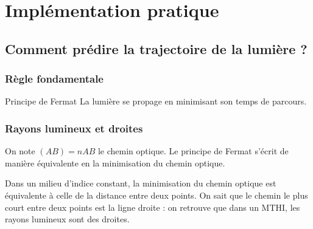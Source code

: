 \documentclass{beamercours}
\begin{document}
\section{Implémentation pratique}
\subsection{Comment prédire la trajectoire de la lumière ?}

\begin{frame}
\frametitle{Règle fondamentale}
\begin{théorème}{Principe de Fermat}{}
La lumière se propage en minimisant son temps de parcours.
\end{théorème}
\end{frame}

\begin{frame}
\frametitle{Rayons lumineux et droites}
On note $(AB) = nAB$ le chemin optique. Le principe de Fermat s'écrit de manière équivalente en la minimisation du chemin optique.\\
\begin{remarque}{}{}
	Dans un milieu d'indice constant, la minimisation du chemin optique est équivalente à celle de la distance entre deux points. On sait que le chemin le plus court entre deux points est la ligne droite : on retrouve que dans un MTHI, les rayons lumineux sont des droites.
\end{remarque}
\end{frame}
\end{document}
